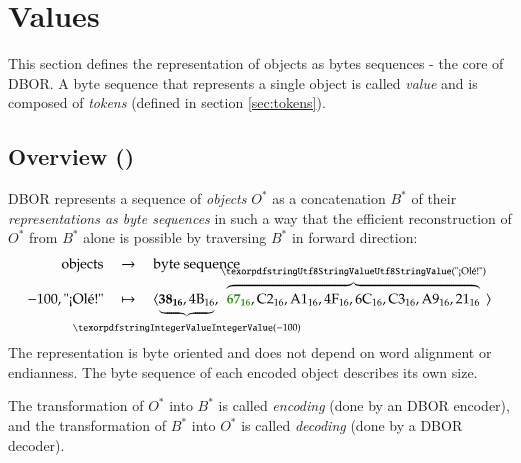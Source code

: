 
\section{Values}
\label{sec:values}

This section defines the representation of objects as bytes sequences - the core of DBOR.
A byte sequence that represents a single object is called \emph{value} and is composed of \emph{tokens}
(defined in section \ref{sec:tokens}).


\subsection{Overview (\DborValue)}
\hypertarget{sec:def:Value}{}

DBOR represents a sequence of \emph{objects} $O^*$ as a concatenation $B^*$ of their \emph{representations as byte
sequences} in such a way that the efficient reconstruction of $O^*$ from $B^*$ alone is possible by traversing $B^*$
in forward direction:
\begin{align*}
    \text{objects} & \quad\rightarrow\quad \text{byte sequence} \\[-2ex]
    -100, \text{"¡Olé!"}
        & \quad\mapsto\quad
    \ByteSequence{
        \underbrace{%
            \DborFirstByteNumber{38}, \DborNextByte{4B}
        }_{\hskip-\textwidth\DborIntegerValue(-100)\hskip-\textwidth},
        \overbrace{%
            \DborFirstByteString{67},
            \DborNextByte{C2}, \DborNextByte{A1},
            \DborNextByte{4F}, \DborNextByte{6C},
            \DborNextByte{C3}, \DborNextByte{A9},
            \DborNextByte{21}
        }^{\DborUtfEightStringValue(\text{"¡Olé!"})}
    }
\end{align*}
The representation is byte oriented and does not depend on word alignment or endianness.
The byte sequence of each encoded object describes its own size.

\medskip
The transformation of $O^*$ into $B^*$ is called \emph{encoding} (done by an DBOR encoder),
and the transformation of $B^*$ into $O^*$ is called \emph{decoding} (done by a DBOR decoder).

